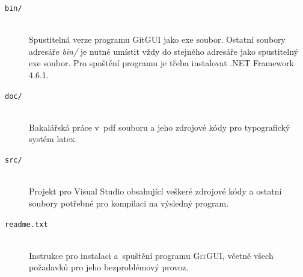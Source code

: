 \documentclass[
  biblatex,
  glossaries,
  index
]{kidiplom}
\begin{document}
\begin{description}

\item[\texttt{bin/}] \hfill \\
  Spustitelná verze programu GitGUI jako exe soubor. Ostatní soubory adresáře \textit{bin/} je nutné umístit vždy do stejného adresáře jako spustitelný exe soubor. Pro spuštění programu je třeba instalovat .NET Framework 4.6.1.
  
\item[\texttt{doc/}] \hfill \\
  Bakalářská práce v~pdf souboru a jeho zdrojové kódy pro typografický systém latex.
  
\item[\texttt{src/}] \hfill \\
Projekt pro Visual Studio obsahující veškeré zdrojové kódy a ostatní soubory potřebné pro kompilaci na výsledný program.

\item[\texttt{readme.txt}] \hfill \\
  Instrukce pro instalaci a~spuštění programu \textsc{GitGUI}, včetně
  všech požadavků pro jeho bezproblémový provoz.

\end{description}


\nocite{*}
\printbibliography
\end{document}
